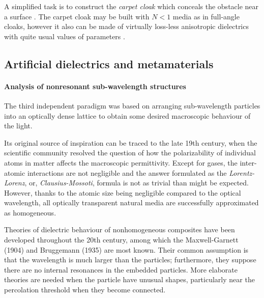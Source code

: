 A simplified task is to construct the \textit{carpet cloak} which conceals the obstacle near a surface \cite{valentine2009optical}.
The carpet cloak may be built with $N<1$ media as in full-angle cloaks, however it also can be made of virtually loss-less anisotropic dielectrics with quite usual values of parameters \cite{wang2013homogeneous}.


\subsection{Artificial dielectrics and metamaterials} 
\paragraph{Analysis of nonresonant sub-wavelength structures} %
The third independent paradigm was based on arranging sub-wavelength particles into an optically dense lattice to obtain some desired macroscopic behaviour of the light. 

Its original source of inspiration can be traced to the late 19th century, when the scientific community resolved the question of how the polarizability of individual atoms in matter affects the macroscopic permittivity. Except for gases, the inter-atomic interactions are not negligible and the answer formulated as the \textit{Lorentz-Lorenz}, or, \textit{Clausius-Mossoti}, formula is not as trivial than might be expected. However, thanks to the atomic size being negligible compared to the optical wavelength, all optically transparent natural media are successfully approximated as homogeneous. 

Theories of dielectric behaviour of nonhomogeneous composites have been developed throughout the 20th century, among which the Maxwell-Garnett (1904) and Bruggemann (1935) are most known. Their common assumption is that the wavelength is much larger than the particles; furthermore, they suppose there are no internal resonances in the embedded particles. More elaborate theories are needed when the particle have unusual shapes, particularly near the percolation threshold when they become connected.


